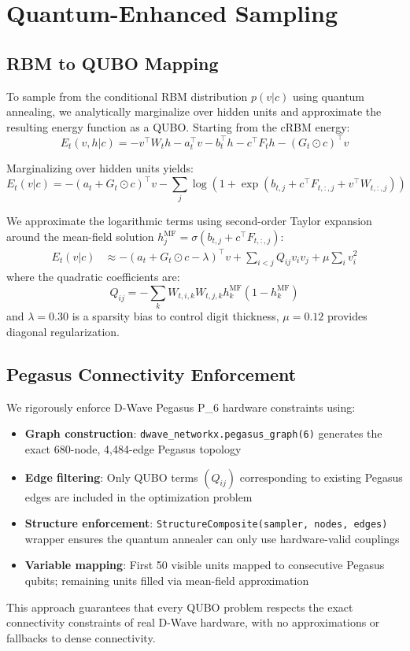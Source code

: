 \documentclass[11pt]{article}
\begin{document}
\section{Quantum-Enhanced Sampling}

\subsection{RBM to QUBO Mapping}
To sample from the conditional RBM distribution $p(v|c)$ using quantum annealing, we analytically marginalize over hidden units and approximate the resulting energy function as a QUBO. Starting from the cRBM energy:
$$E_t(v, h | c) = -v^\top W_t h - a_t^\top v - b_t^\top h - c^\top F_t h - (G_t \odot c)^\top v$$

Marginalizing over hidden units yields:
$$E_t(v | c) = -(a_t + G_t \odot c)^\top v - \sum_j \log(1 + \exp(b_{t,j} + c^\top F_{t,:,j} + v^\top W_{t,:,j}))$$

We approximate the logarithmic terms using second-order Taylor expansion around the mean-field solution $h_j^{\text{MF}} = \sigma(b_{t,j} + c^\top F_{t,:,j})$:
\begin{align}
E_t(v | c) &\approx -(a_t + G_t \odot c - \lambda)^\top v + \sum_{i<j} Q_{ij} v_i v_j + \mu \sum_i v_i^2
\end{align}
where the quadratic coefficients are:
$$Q_{ij} = -\sum_k W_{t,i,k} W_{t,j,k} h_k^{\text{MF}} (1 - h_k^{\text{MF}})$$
and $\lambda = 0.30$ is a sparsity bias to control digit thickness, $\mu = 0.12$ provides diagonal regularization.

\subsection{Pegasus Connectivity Enforcement}
We rigorously enforce D-Wave Pegasus P_6 hardware constraints using:
\begin{itemize}
    \item \textbf{Graph construction}: \texttt{dwave\_networkx.pegasus\_graph(6)} generates the exact 680-node, 4,484-edge Pegasus topology
    \item \textbf{Edge filtering}: Only QUBO terms $(Q_{ij})$ corresponding to existing Pegasus edges are included in the optimization problem
    \item \textbf{Structure enforcement}: \texttt{StructureComposite(sampler, nodes, edges)} wrapper ensures the quantum annealer can only use hardware-valid couplings
    \item \textbf{Variable mapping}: First 50 visible units mapped to consecutive Pegasus qubits; remaining units filled via mean-field approximation
\end{itemize}
This approach guarantees that every QUBO problem respects the exact connectivity constraints of real D-Wave hardware, with no approximations or fallbacks to dense connectivity.
\end{document}
